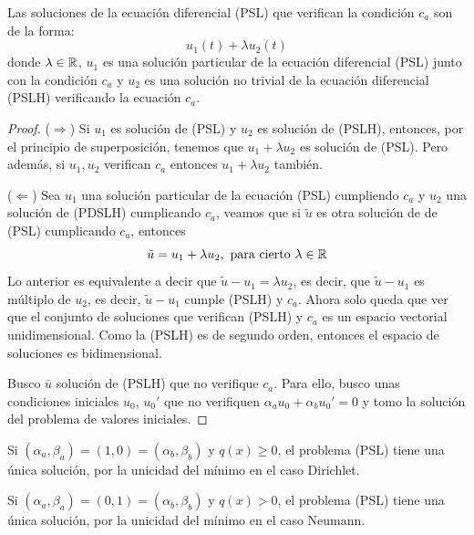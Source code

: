 \begin{lemma}
Las soluciones de la ecuación diferencial (PSL) que verifican la condición $c_a$ son de la forma:
\[
u_1(t)+\lambda u_2(t)
\]
donde $\lambda\in\mathbb{R}$, $u_1$ es una solución particular de la ecuación diferencial (PSL) junto con la condición $c_a$ y $u_2$ es una solución no trivial de la ecuación diferencial (PSLH) verificando la ecuación $c_a$.
\end{lemma}
\begin{proof}
($\Rightarrow$) Si $u_1$ es solución de (PSL) y $u_2$ es solución de (PSLH), entonces, por el principio de superposición, tenemos que $u_1+\lambda u_2$ es solución de (PSL).
Pero además, si $u_1,u_2$ verifican $c_a$ entonces $u_1+\lambda u_2$ también.

($\Leftarrow$) Sea $u_1$ una solución particular de la ecuación (PSL) cumpliendo $c_a$ y $u_2$ una solución de (PDSLH) cumplicando $c_a$, veamos que si $\tilde{u}$ es otra solución de de (PSL) cumplicando $c_a$, entonces 
\[
\tilde{u}=u_1+\lambda u_2, \text{ para cierto } \lambda\in\mathbb{R}
\]
Lo anterior es equivalente a decir que $\tilde{u}-u_1=\lambda u_2$, es decir, que $\tilde{u}-u_1$ es múltiplo de $u_2$, es decir, $\tilde{u}-u_1$ cumple (PSLH) y $c_a$. Ahora solo queda que ver que el conjunto de soluciones que verifican (PSLH) y $c_a$ es un espacio vectorial unidimensional. Como la (PSLH) es de segundo orden, entonces el espacio de soluciones es bidimensional.

Busco $\bar{u}$ solución de (PSLH) que no verifique $c_a$. Para ello, busco unas condiciones iniciales $u_0$, $u_0'$ que no verifiquen $\alpha_a u_0+\alpha_b u_0'=0$ y tomo la solución del problema de valores iniciales.
\end{proof}

\begin{coro}
Si $(\alpha_a,\beta_a)=(1,0)=(\alpha_b,\beta_b)$ y $q(x)\geq 0$, el problema (PSL) tiene una única solución, por la unicidad del mínimo en el caso Dirichlet.
\end{coro}
\begin{coro}
Si $(\alpha_a,\beta_a)=(0,1)=(\alpha_b,\beta_b)$ y $q(x)>0$, el problema (PSL) tiene una única solución, por la unicidad del mínimo en el caso Neumann.
\end{coro}